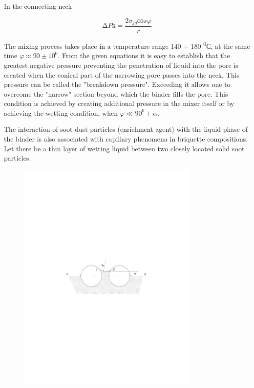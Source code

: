 In the connecting neck

\[\mathrm{\Delta}Pк = \frac{2\sigma_{jg}соs\varphi}{r}\]

The mixing process takes place in a temperature range 140 ÷ 180
\textsuperscript{0}С, at the same time
\(\varphi \approx 90 \pm 10^{0}\). From the given equations it is easy
to establish that the greatest negative pressure preventing the
penetration of liquid into the pore is created when the conical part of
the narrowing pore passes into the neck. This pressure can be called the
"breakdown pressure". Exceeding it allows one to overcome the "narrow"
section beyond which the binder fills the pore. This condition is
achieved by creating additional pressure in the mixer itself or by
achieving the wetting condition, when \(\varphi \ll 90^{0} + \alpha.\)

The interaction of soot dust particles (enrichment agent) with the
liquid phase of the binder is also associated with capillary phenomena
in briquette compositions. Let there be a thin layer of wetting liquid
between two closely located solid soot particles.

\begin{figure}[H]
	\centering
	\includegraphics[width=0.8\textwidth]{media/gorn2/image12}
	\caption*{}
\end{figure}


